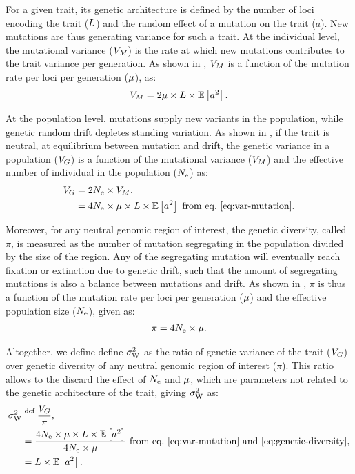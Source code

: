 \documentclass{article}
\begin{document}
For a given trait, its genetic architecture is defined by the number of loci encoding the trait ($L$) and the random effect of a mutation on the trait ($a$).
New mutations are thus generating variance for such a trait.
At the individual level, the mutational variance ($V_{M}$) is the rate at which new mutations contributes to the trait variance per generation.
As shown in \textcite{lande_quantitative_1979, lande_sexual_1980}, $V_{M}$ is a function of the mutation rate per loci per generation ($\mu$), as:
\begin{gather}
    V_{M} = 2 \mu \times L \times \operatorname{\mathbb{E}} \left[ a^2 \right] \label{eq:var-mutation}.
\end{gather}

At the population level, mutations supply new variants in the population, while genetic random drift depletes standing variation.
As shown in \textcite{lynch_mutation_1998}, if the trait is neutral, at equilibrium between mutation and drift, the genetic variance in a population ($V_{G}$) is a function of the mutational variance ($V_{M}$) and the effective number of individual in the population ($N_{\text{e}}$) as:
\begin{align}
    V_{G} & =  2 N_{\text{e}} \times V_{M}, \\
    & = 4 N_{\text{e}} \times \mu \times L \times \operatorname{\mathbb{E}} \left[ a^2 \right] \text{ from eq.~\ref{eq:var-mutation}}\label{eq:var-genetic}.
\end{align}

Moreover, for any neutral genomic region of interest, the genetic diversity, called $\pi$, is measured as the number of mutation segregating in the population divided by the size of the region.
Any of the segregating mutation will eventually reach fixation or extinction due to genetic drift, such that the amount of segregating mutations is also a balance between mutations and drift.
As shown in \textcite{tajima_statistical_1989}, $\pi$ is thus a function of the mutation rate per loci per generation ($\mu$) and the effective population size ($N_{\text{e}}$), given as:
\begin{gather}
    \pi = 4 N_{\text{e}} \times \mu \label{eq:genetic-diversity}.
\end{gather}

Altogether, we define define $\sigma^2_{\text{W}}$ as the ratio of genetic variance of the trait ($V_{G}$) over genetic diversity of any neutral genomic region of interest ($\pi$).
This ratio allows to the discard the effect of $N_{\text{e}}$ and $\mu$, which are parameters not related to the genetic architecture of the trait, giving $\sigma^2_{\text{W}}$ as:
\begin{align}
    \sigma^2_{\text{W}} & \stackrel{\text{def}}{=} \frac{V_{G} }{\pi}, \\
    & = \frac{4 N_{\text{e}} \times \mu \times L \times \operatorname{\mathbb{E}} \left[ a^2 \right]}{4 N_{\text{e}} \times \mu} \text{ from eq.~\ref{eq:var-mutation} and~\ref{eq:genetic-diversity}}, \\
    & = L \times \operatorname{\mathbb{E}} \left[ a^2 \right]. \label{eq:rate-pop}
\end{align}
\end{document}
